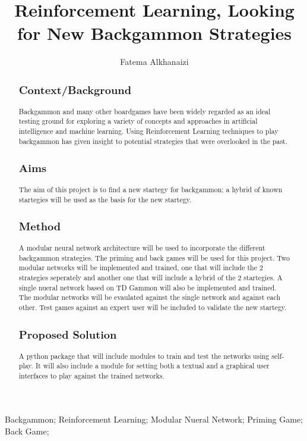\documentclass[12pt,a4paper]{article}
\title{Reinforcement Learning, Looking for New Backgammon Strategies}
\author{Fatema Alkhanaizi}
\date{}
\begin{document}
\maketitle

\begin{abstract}
\subsection{Context/Background}
Backgammon and many other boardgames have been widely regarded as an ideal testing ground for exploring a variety of concepts and approaches in artificial intelligence and machine learning. Using Reinforcement Learning techniques to play backgammon has given insight to potential strategies that were overlooked in the past.
\subsection{Aims}
The aim of this project is to find a new startegy for backgammon; a hybrid of known startegies will be used as the basis for the new startegy. 
\subsection{Method}
A modular neural network architecture will be used to incorporate the different backgammon strategies. The priming and back games will be used for this project. Two modular networks will be implemented and trained, one that will include the 2 strategies seperately and another one that will include a hybrid of the 2 startegies. A single nueral network based on TD Gammon will also be implemented and trained. The modular networks will be evaulated against the single network and against each other. Test games against an expert user will be included to validate the new startegy.
\subsection{Proposed Solution}
A python package that will include modules to train and test the networks using self-play. It will also include a module for setting both a textual and a graphical user interfaces to play against the trained networks. 
\end{abstract}

\begin{keywords}
Backgammon; Reinforcement Learning; Modular Nueral Network; Priming Game; Back Game;
\end{keywords}
\end{document}
